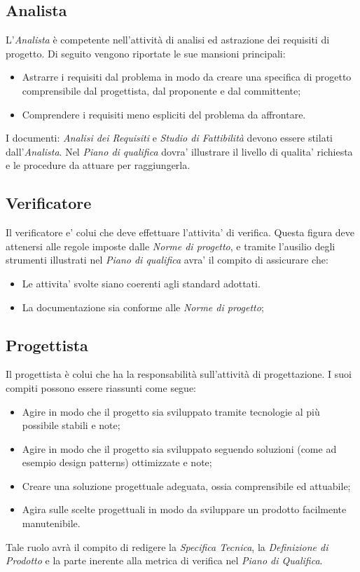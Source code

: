 \subsection{Analista}
L'\textit{Analista} è competente nell'attività di analisi ed astrazione dei requisiti di progetto.
Di seguito vengono riportate le sue mansioni principali:
\begin{itemize}
\item Astrarre i requisiti dal problema in modo da creare una specifica di progetto comprensibile dal progettista, dal proponente e dal committente;
\item Comprendere i requisiti meno espliciti del problema da affrontare.
\end{itemize}

I documenti: \textit{Analisi dei Requisiti} e \textit{Studio di Fattibilità} devono essere stilati dall'\textit{Analista}.
Nel \textit{Piano di qualifica} dovra' illustrare il livello di qualita' richiesta e le procedure da attuare per raggiungerla.

\subsection{Verificatore}
Il verificatore e' colui che deve effettuare l'attivita' di verifica. Questa figura deve attenersi alle regole imposte dalle \textit{Norme di progetto}, e tramite l'ausilio degli strumenti illustrati nel \textit{Piano di qualifica} avra' il compito di assicurare che:
\begin{itemize}
\item Le attivita' svolte siano coerenti agli standard adottati.
\item La documentazione sia conforme alle \textit{Norme di progetto};
\end{itemize}

\subsection{Progettista}
Il progettista è colui che ha la responsabilità sull'attività di progettazione. I suoi compiti possono essere riassunti come segue:
\begin{itemize}
\item Agire in modo che il progetto sia sviluppato tramite tecnologie al più possibile stabili e note;
\item Agire in modo che il progetto sia sviluppato seguendo soluzioni (come ad esempio design patterns) ottimizzate e note;
\item Creare una soluzione progettuale adeguata, ossia comprensibile ed attuabile;
\item Agira sulle scelte progettuali in modo da sviluppare un prodotto facilmente manutenibile.
\end{itemize}
Tale ruolo avrà il compito di redigere la \textit{Specifica Tecnica}, la \textit{Definizione di Prodotto} e la parte inerente alla metrica di verifica nel \textit{Piano di Qualifica}.
